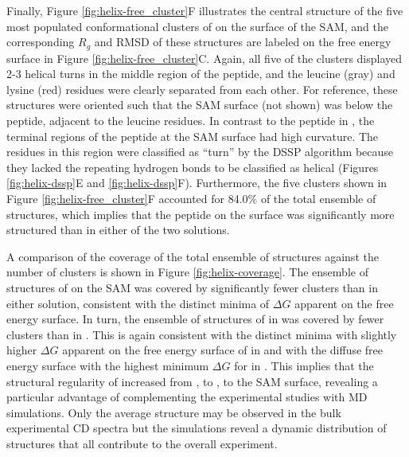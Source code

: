 Finally, Figure \ref{fig:helix-free_cluster}F illustrates the central structure of the five most populated conformational clusters of \pep{} on the surface of the SAM, and the corresponding $R_g$ and RMSD of these structures are labeled on the free energy surface in Figure \ref{fig:helix-free_cluster}C. 
Again, all five of the clusters displayed 2-3 helical turns in the middle region of the peptide, and the leucine (gray) and lysine (red) residues were clearly separated from each other. 
For reference, these structures were oriented such that the SAM surface (not shown) was below the peptide, adjacent to the leucine residues. 
In contrast to the peptide in \tbawat{}, the terminal regions of the peptide at the SAM surface had high curvature. 
The residues in this region were classified as ``turn'' by the DSSP algorithm because they lacked the repeating hydrogen bonds to be classified as helical (Figures \ref{fig:helix-dssp}E and \ref{fig:helix-dssp}F). 
Furthermore, the five clusters shown in Figure \ref{fig:helix-free_cluster}F accounted for 84.0\% of the total ensemble of structures, which implies that the peptide on the surface was significantly more structured than in either of the two solutions.

A comparison of the coverage of the total ensemble of structures against the number of clusters is shown in Figure \ref{fig:helix-coverage}. 
The ensemble of structures of \pep{} on the SAM was covered by significantly fewer clusters than \pep{} in either solution, consistent with the distinct minima of $\Delta G$ apparent on the free energy surface. 
In turn, the ensemble of structures of \pep{} in  was covered by fewer clusters than \pep{} in \tbawat{}. 
This is again consistent with the distinct minima with slightly higher $\Delta G$ apparent on the free energy surface of \pep{} in  and with the diffuse free energy surface with the highest minimum $\Delta G$ for \pep{} in \tbawat{}. 
This implies that the structural regularity of \pep{} increased from \tbawat{}, to , to the SAM surface, revealing a particular advantage of complementing the experimental studies with MD simulations. 
Only the average structure may be observed in the bulk experimental CD spectra but the simulations reveal a dynamic distribution of structures that all contribute to the overall experiment. 

